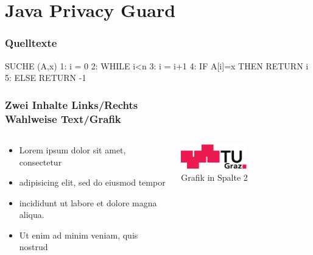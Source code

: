 \documentclass{beamer}
\begin{document}
\section{Java Privacy Guard}

\begin{frame}[fragile]
	\frametitle{Quelltexte}
	\begin{spacing}{1}
	\begin{semiverbatim}
SUCHE (A,x)
1: i = 0
2: WHILE i<n
3:     i = i+1
4:     \alert{IF A[i]=x THEN RETURN i}
5: ELSE RETURN -1
	\end{semiverbatim}
	\end{spacing}
\end{frame}



\begin{frame}
	\frametitle{Zwei Inhalte Links/Rechts\\Wahlweise Text/Grafik}
	\begin{columns}[onlytextwidth]
		\begin{column}{0.5\textwidth}
			\begin{itemize}
				\item Lorem ipsum dolor sit amet, consectetur 
				\item adipisicing elit, sed do eiusmod tempor 
				\item incididunt ut labore et dolore magna aliqua. 
				\item Ut enim ad minim veniam, quis nostrud 
			\end{itemize}
		\end{column}
		\begin{column}{0.5\textwidth}
			\begin{center}
			\includegraphics[width=0.5\textwidth]{logo.pdf}\\
			Grafik in Spalte 2
			\end{center}
		\end{column}
	\end{columns}
\end{frame}
\end{document}
